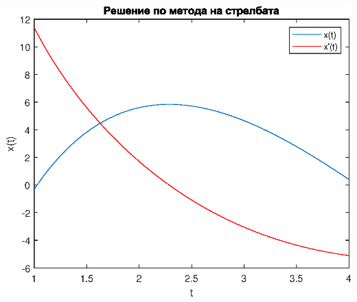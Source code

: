 \documentclass[a4paper,fleqn,12pt]{article}
\begin{document}
\includegraphics {fourthTask_01.eps}
\end{document}
